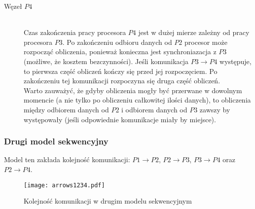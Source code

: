 \begin{description}
\item[Węzeł $P4$] \hfill \\

Czas zakończenia pracy procesora $P4$ jest w dużej mierze zależny od pracy procesora $P3$. Po zakończeniu odbioru danych od $P2$ procesor może rozpocząć obliczenia,
ponieważ konieczna jest synchroniazacja z $P3$ (możliwe, że kosztem bezczynności).
Jeśli komunikacja $P3 \to P4$ występuje, to pierwsza część obliczeń kończy się przed jej rozpoczęciem. Po zakończeniu tej komunikacji rozpoczyna się druga część obliczeń. \\

Warto zauważyć, że gdyby obliczenia mogły być przerwane w dowolnym momencie (a nie tylko po obliczeniu całkowitej ilości danych),
to obliczenia między odbiorem danych od $P2$ i odbiorem danych od $P3$ zawszy by występowały (jeśli odpowiednie komunikacje miały by miejsce).

\end{description}

\subsubsection{Drugi model sekwencyjny}

Model ten zakłada kolejność komunikacji: $P1 \to P2$, $P2 \to P3$, $P3 \to P4$ oraz $P2 \to P4$. \\

\begin{figure}[!ht]
\centering
\texttt{[image: arrows1234.pdf]}
\caption{Kolejność komunikacji w drugim modelu sekwencyjnym}
\label{fig:seq2}
\end{figure}

